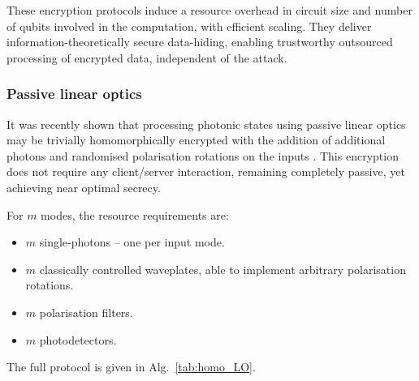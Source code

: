 \documentclass[aps,rmp,twocolumn,amsmath,amssymb,nofootinbib,superscriptaddress]{revtex4}
\begin{document}
These encryption protocols induce a resource overhead in circuit size and number of qubits involved in the computation, with efficient scaling. They deliver information-theoretically secure data-hiding, enabling trustworthy outsourced processing of encrypted data, independent of the attack.

%
%

\subsubsection{Passive linear optics}

It was recently shown that processing photonic states using passive linear optics may be trivially homomorphically encrypted with the addition of additional photons and randomised polarisation rotations on the inputs \cite{bib:RohdeQWEnc12}. This encryption does not require any client/server interaction, remaining completely passive, yet achieving near optimal secrecy.

For $m$ modes, the resource requirements are:
\begin{itemize}
\item $m$ single-photons -- one per input mode.
\item $m$ classically controlled waveplates, able to implement arbitrary polarisation rotations.
\item $m$ polarisation filters.
\item $m$ photodetectors.
\end{itemize}
The full protocol is given in Alg.~\ref{tab:homo_LO}.
\end{document}
